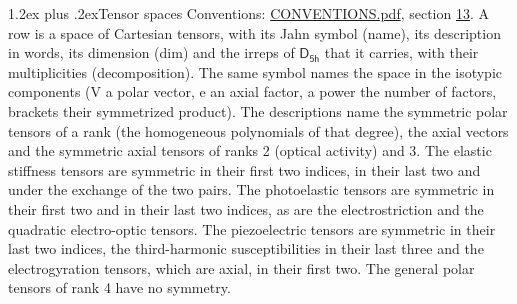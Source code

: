 \documentclass[10pt,a4paper]{article}
\makeatletter
\renewcommand\section{\@startsection{section}{1}{\z@}{-3ex plus -1ex minus -.2ex}%
  {1.2ex plus .2ex}{\normalfont\large\sffamily\bfseries\color{parttitle}}}
\numberwithin{equation}{section}
\newcommand{\grp}[1]{\mathsf{#1}}
\makeatother
\begin{document}
\section{Tensor spaces}\label{s:tensor_spaces}
Conventions: \href{../../CONVENTIONS.pdf}{CONVENTIONS.pdf}, section \href{../../CONVENTIONS.pdf\#conv.13}{13}.
\leavevmode\label{n:head.name}\label{n:head.description}\label{n:head.dim}\label{n:head.decomposition}A row is a space of Cartesian tensors, with its Jahn symbol (name), its description in words, its dimension (dim) and the irreps of $\grp{D_{5h}}$ that it carries, with their multiplicities (decomposition). \label{n:label.jahn}The same symbol names the space in the isotypic components (V a polar vector, e an axial factor, a power the number of factors, brackets their symmetrized product). The descriptions name the symmetric polar tensors of a rank (the homogeneous polynomials of that degree), the axial vectors and the symmetric axial tensors of ranks 2 (optical activity) and 3. The elastic stiffness tensors are symmetric in their first two indices, in their last two and under the exchange of the two pairs. The photoelastic tensors are symmetric in their first two and in their last two indices, as are the electrostriction and the quadratic electro-optic tensors. The piezoelectric tensors are symmetric in their last two indices, the third-harmonic susceptibilities in their last three and the electrogyration tensors, which are axial, in their first two. The general polar tensors of rank 4 have no symmetry.
\end{document}
